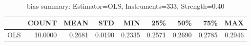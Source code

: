 \begin{table}[ht]
\centering
\caption{bias summary: Estimator=OLS, Instruments=333, Strength=0.40}
\begin{tabular}{lrrrrrrrr}
\toprule
 & COUNT & MEAN & STD & MIN & 25\% & 50\% & 75\% & MAX \\
\midrule
OLS & 10.0000 & 0.2681 & 0.0190 & 0.2335 & 0.2571 & 0.2690 & 0.2785 & 0.2946 \\
\bottomrule
\end{tabular}
\end{table}
